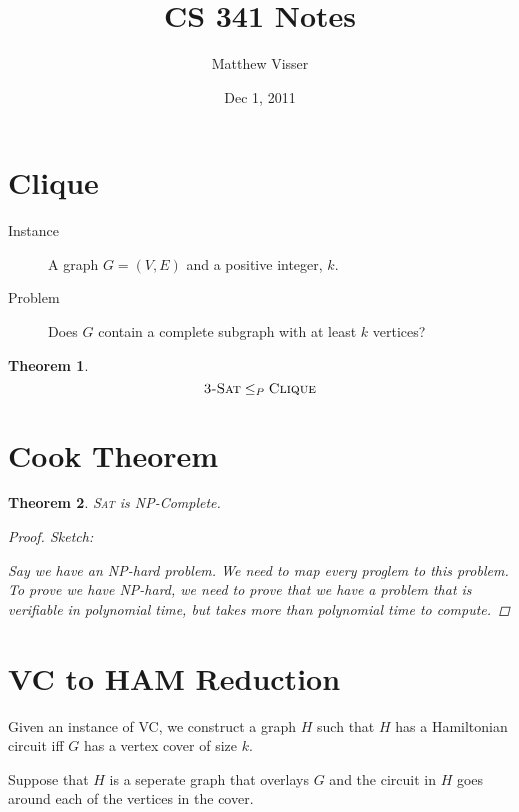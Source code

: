 \documentclass[12pt]{article}
\newtheorem{thm}{Theorem}
\begin{document}
\title{CS 341 Notes}
\author{Matthew Visser}
\date{Dec  1, 2011}
\maketitle

\section{Clique}

\begin{description}
	\item[Instance] A graph $G = (V,E)$ and a positive integer, $k$.
	\item[Problem] Does $G$ contain a complete subgraph with at least $k$ vertices?
\end{description}

\begin{thm}
	\begin{equation}
		\textsc{3-Sat} \le_{P} \textsc{Clique}
	\end{equation}
\end{thm}

\section{Cook Theorem}

\begin{thm}
	\textsc{Sat} is NP-Complete.
	\begin{proof}
		Sketch:

		Say we have an NP-hard problem. We need to map every proglem to this
		problem. To prove we have NP-hard, we need to prove that we have a
		problem that is verifiable in polynomial time, but takes more than
		polynomial time to compute.
	\end{proof}
\end{thm}

\section{VC to HAM Reduction}

Given an instance of VC, we construct a graph $H$ such that $H$ has a
Hamiltonian circuit iff $G$ has a vertex cover of size $k$.

Suppose that $H$ is a seperate graph that overlays $G$ and the circuit in $H$
goes around each of the vertices in the cover.
\end{document}
